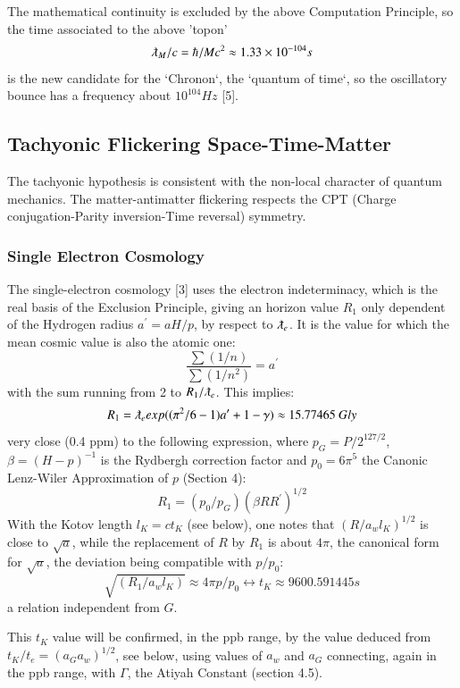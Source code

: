 \documentclass[twoside,draft]{article}
\begin{document}
\begin{sloppypar}
{The mathematical continuity is excluded by the above Computation Principle, so the time associated
to the above 'topon' 
$$\lambdabar_{M} /c = \hbar/Mc^2 \approx 1.33 \times 10^{-104}s$$
is the new candidate for the `Chronon`, the `quantum of time`, so the
oscillatory bounce has a frequency about $10^{104}Hz $ [5].

\subsection{Tachyonic Flickering Space-Time-Matter}

The tachyonic hypothesis is consistent with the non-local character of quantum mechanics. The
matter-antimatter flickering respects the CPT (Charge conjugation-Parity inversion-Time reversal) symmetry.

\subsubsection{Single Electron Cosmology}

The single-electron cosmology [3] uses the electron indeterminacy, which is the real basis of the
Exclusion Principle, giving an horizon value $R_1$ only dependent of the Hydrogen radius $a^{\prime} = aH/p$, by respect to $\lambdabar_e$. It
is the value for which the mean cosmic value is also the atomic one:
\begin{equation}
\frac{\sum(1/n)}{\sum(1/n^{2})} = a^{\prime}
\end{equation}
with the sum running from 2 to $R_{1} /\lambdabar_{e}$. This implies:
$$R_{1} = \lambdabar_{e} exp((\pi^{2} /6 - 1)a^{\prime} + 1 - \gamma) \approx 15.77465 ~ Gly$$
very close (0.4 ppm) to the following expression, where $p_{G} = P/2^{127/2}$, $\beta = (H - p)^{-1}$ is the
Rydbergh correction factor and $p_{0} = 6\pi^{5}$ the Canonic Lenz-Wiler Approximation of $p$ (Section 4):
$$R_{1} = ( p_{0} /p_{G} )(\beta R R^{\prime})^{1/2}$$
With the Kotov length $l_{K} = ct_{K}$ (see below), one notes that $(R/a_w l_K)^{1/2} $ is close to $\sqrt{a}$, while
the replacement of $R$ by $R_{1}$ is about $4\pi$, the canonical form for $\sqrt{a}$, the deviation being compatible
with $p/p_{0}$:
$$\sqrt{(R_{1} /a_{w} l_{K})} \approx 4\pi p/p_{0} \leftrightarrow t_{K} \approx 9 600.591445 s$$ a relation independent from $G$. 

This $t_K$ value will be confirmed, in the ppb range, by the value
deduced from $t_{K} /t_{e} = (a_{G} a_{w})^{1/2}$, see below, using values of $a_{w}$ and $a_{G}$ connecting, again in the ppb
range, with $\Gamma$, the Atiyah Constant (section 4.5).

}
\end{sloppypar}
\end{document}
